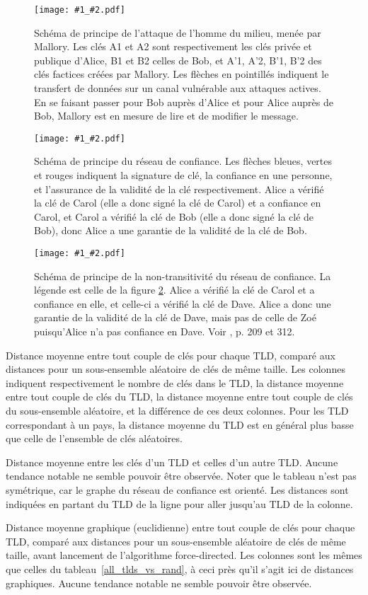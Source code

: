 \documentclass[a4paper]{article}
\newcommand{\sch}[3]{
\begin{figure}
\centering
\texttt{[image: \#1\_\#2.pdf]}
\caption{#3}
\label{sch_#2}
\end{figure}
}
\newcommand{\tbl}[2]{
\begin{table}[p]
\centering

\caption{#2}
\label{#1}
\end{table}
}
\begin{document}
\sch{schemas/sch}{alice_bob_mallory}{Schéma de principe de l'attaque de l'homme du milieu, menée par Mallory. Les clés A1 et A2 sont respectivement les clés privée et publique d'Alice, B1 et B2 celles de Bob, et A'1, A'2, B'1, B'2 des clés factices créées par Mallory. Les flèches en pointillés indiquent le transfert de données sur un canal vulnérable aux attaques actives. En se faisant passer pour Bob auprès d'Alice et pour Alice auprès de Bob, Mallory est en mesure de lire et de modifier le message.}

\sch{schemas/sch}{alice_carol_bob}{Schéma de principe du réseau de confiance. Les flèches bleues, vertes et rouges indiquent la signature de clé, la confiance en une personne, et l'assurance de la validité de la clé respectivement. Alice a vérifié la clé de Carol (elle a donc signé la clé de Carol) et a confiance en Carol, et Carol a vérifié la clé de Bob (elle a donc signé la clé de Bob), donc Alice a une garantie de la validité de la clé de Bob.}

\sch{schemas/sch}{alice_carol_dave_zoe}{Schéma de principe de la non-transitivité du réseau de confiance. La légende est celle de la figure \ref{sch_alice_carol_bob}. Alice a vérifié la clé de Carol et a confiance en elle, et celle-ci a vérifié la clé de Dave. Alice a donc une garantie de la validité de la clé de Dave, mais pas de celle de Zoé puisqu'Alice n'a pas confiance en Dave. Voir \cite{TC}, p. 209 et 312.}


\tbl{all_tlds_vs_rand}{Distance moyenne entre tout couple de clés pour chaque TLD, comparé aux distances pour un sous-ensemble aléatoire de clés de même taille. Les colonnes indiquent respectivement le nombre de clés dans le TLD, la distance moyenne entre tout couple de clés du TLD, la distance moyenne entre tout couple de clés du sous-ensemble aléatoire, et la différence de ces deux colonnes. Pour les TLD correspondant à un pays, la distance moyenne du TLD est en général plus basse que celle de l'ensemble de clés aléatoires.}

\tbl{all_tlds_to_all_tlds.custom}{Distance moyenne entre les clés d'un TLD et celles d'un autre TLD. Aucune tendance notable ne semble pouvoir être observée. Noter que le tableau n'est pas symétrique, car le graphe du réseau de confiance est orienté. Les distances sont indiquées en partant du TLD de la ligne pour aller jusqu'au TLD de la colonne.}

\tbl{dist_vs_gdist_before}{Distance moyenne graphique (euclidienne) entre tout couple de clés pour chaque TLD, comparé aux distances pour un sous-ensemble aléatoire de clés de même taille, avant lancement de l'algorithme force-directed. Les colonnes sont les mêmes que celles du tableau~\ref{all_tlds_vs_rand}, à ceci près qu'il s'agit ici de distances graphiques. Aucune tendance notable ne semble pouvoir être observée.}
\end{document}
